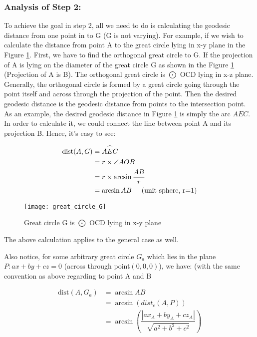 \documentclass[12pt]{article}
\numberwithin{equation}{section}
\begin{document}
	\subsubsection{Analysis of Step 2:}  \par
		To achieve the goal in step 2, all we need to do is  calculating the geodesic distance from one point in  to G (G is not varying). For example, if we wish to calculate the distance from point A to the great circle lying in x-y plane in the Figure \ref{fig:greatcircle}. First, we have to find the orthogonal great circle to G. If the projection of A is lying on the diameter of the great circle G as shown in the Figure \ref{fig:greatcircle} (Projection of A is B). The orthogonal great circle is $\bigodot$ OCD lying in x-z plane. Generally, the orthogonal circle is formed by a great circle going through the point itself and across through the projection of the point. Then the desired geodesic distance is the geodesic distance from points to the intersection point.
		As an example, the desired geodesic distance in Figure \ref{fig:greatcircle}  is simply the arc ${AEC}$. In order to calculate it, we could connect the line between point A and its projection B. Hence, it's easy to see:
		\par 
		\begin{align*}
			\text{dist} (A, G) &= \overset{\Huge\frown}{AEC} \\
						&= r \times \angle{AOB} \\
						&= r \times \arcsin \dfrac{AB}{r} \\
						&= \arcsin AB \hspace{5mm} \text{(unit sphere, r=1)}
 		\end{align*}
		
		
		\begin{figure}
			\centering
			\texttt{[image: great\_circle\_G]}
			\caption{Great circle G is $\bigodot$ OCD lying in x-y plane}
			\label{fig:greatcircle}
		\end{figure}
		
		The above calculation applies to the general case as well. \par 
		Also notice, for some arbitrary great circle $G_a$ which lies in the plane $P:ax+by+cz=0$ (across through point$(0, 0, 0)$), we have: (with the same convention as above regarding to point A and B
		\par 
		
		\begin{align}
			\text{dist} (A, G_a) &= \arcsin AB \\
			&= \arcsin (dist_c(A, P)) \\
			&=\arcsin(\dfrac{|ax_A+by_A+cz_A|}{\sqrt{a^2+b^2+c^2}}) \label{dist}
		\end{align}
	
\end{document}
